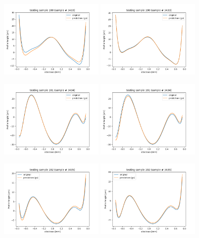 \documentclass{iucr}
\begin{document}
\begin{figure}\label{fig:v20profiles}
\includegraphics[width=0.45\textwidth]{figures/v20p100.png}
\includegraphics[width=0.45\textwidth]{figures/v23p100.png}

\includegraphics[width=0.45\textwidth]{figures/v20p101.png}
\includegraphics[width=0.45\textwidth]{figures/v23p101.png}

\includegraphics[width=0.45\textwidth]{figures/v20p102.png}
\includegraphics[width=0.45\textwidth]{figures/v23p102.png}


\end{figure}
\end{document}
